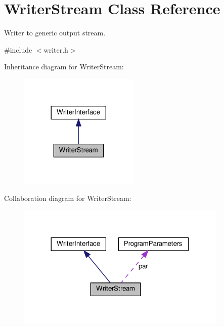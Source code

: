 \hypertarget{classWriterStream}{}\section{Writer\+Stream Class Reference}
\label{classWriterStream}


Writer to generic output stream.  




{\ttfamily \#include $<$writer.\+h$>$}



Inheritance diagram for Writer\+Stream\+:
\nopagebreak
\begin{figure}[H]
\begin{center}
\leavevmode
\includegraphics[width=161pt]{classWriterStream__inherit__graph}
\end{center}
\end{figure}


Collaboration diagram for Writer\+Stream\+:
\nopagebreak
\begin{figure}[H]
\begin{center}
\leavevmode
\includegraphics[width=284pt]{classWriterStream__coll__graph}
\end{center}
\end{figure}
